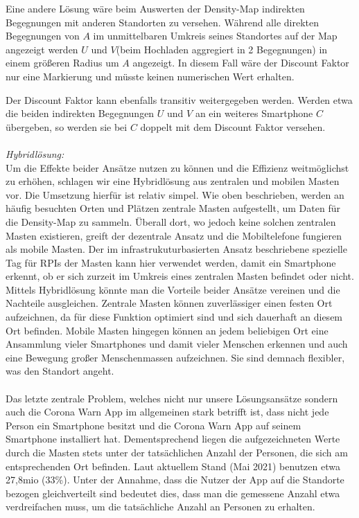 \documentclass[conference,compsoc]{IEEEtran}
\begin{document}
Eine andere Lösung wäre beim Auswerten der Density-Map indirekten Begegnungen mit anderen Standorten zu versehen. 
Während alle direkten Begegnungen von $A$ im unmittelbaren Umkreis seines Standortes auf der Map angezeigt werden $U$ und $V$(beim Hochladen aggregiert in 2 Begegnungen) in einem größeren Radius um $A$ angezeigt.
In diesem Fall wäre der Discount Faktor nur eine Markierung und müsste keinen numerischen Wert erhalten. 

Der Discount Faktor kann ebenfalls transitiv weitergegeben werden. 
Werden etwa die beiden indirekten Begegnungen $U$ und $V$ an ein weiteres Smartphone $C$ übergeben, so werden sie bei $C$ doppelt mit dem Discount Faktor versehen.\\
\\
\textit{Hybridlösung:}\\
Um die Effekte beider Ansätze nutzen zu können und die Effizienz weitmöglichst zu erhöhen, schlagen wir eine Hybridlösung aus zentralen und mobilen Masten vor. 
Die Umsetzung hierfür ist relativ simpel. Wie oben beschrieben, werden an häufig besuchten Orten und Plätzen zentrale Masten aufgestellt, um Daten für die Density-Map zu sammeln. 
Überall dort, wo jedoch keine solchen zentralen Masten existieren, greift der dezentrale Ansatz und die Mobiltelefone fungieren als mobile Masten. 
Der im infrastrukuturbasierten Ansatz beschriebene spezielle Tag für RPIs der Masten kann hier verwendet werden, damit ein Smartphone erkennt, ob er sich zurzeit im Umkreis eines zentralen Masten befindet oder nicht. 
Mittels Hybridlösung könnte man die Vorteile beider Ansätze vereinen und die Nachteile ausgleichen. Zentrale Masten können zuverlässiger einen festen Ort aufzeichnen, da für diese Funktion optimiert sind und sich dauerhaft an diesem Ort befinden.
Mobile Masten hingegen können an jedem beliebigen Ort eine Ansammlung vieler Smartphones und damit vieler Menschen erkennen und auch eine Bewegung großer Menschenmassen aufzeichnen.
Sie sind demnach flexibler, was den Standort angeht.\\
\\
Das letzte zentrale Problem, welches nicht nur unsere Lösungsansätze sondern auch die Corona Warn App im allgemeinen stark betrifft ist, dass nicht jede Person ein Smartphone besitzt und die  Corona Warn App auf seinem Smartphone installiert hat. 
Dementsprechend liegen die aufgezeichneten Werte durch die Masten stets unter der tatsächlichen Anzahl der Personen, die sich am entsprechenden Ort befinden. Laut aktuellem Stand (Mai 2021) benutzen etwa 27,8mio (33\%). \cite{Downloads}
Unter der Annahme, dass die Nutzer der App auf die Standorte bezogen gleichverteilt sind bedeutet dies, dass man die gemessene Anzahl etwa verdreifachen muss, um die tatsächliche Anzahl an Personen zu erhalten.\\
\end{document}
